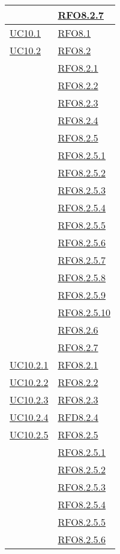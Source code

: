 \begin{longtable}{|>{\centering}m{5cm}|m{5cm}<{\centering}|}
& \hyperlink{RFO8.2.7}{RFO8.2.7}\\\hline
\hyperlink{UC10.1}{UC10.1} & \hyperlink{RFO8.1}{RFO8.1}\\\hline
\hyperlink{UC10.2}{UC10.2} & \hyperlink{RFO8.2}{RFO8.2}\\
& \hyperlink{RFO8.2.1}{RFO8.2.1}\\
& \hyperlink{RFO8.2.2}{RFO8.2.2}\\
& \hyperlink{RFO8.2.3}{RFO8.2.3}\\
& \hyperlink{RFO8.2.4}{RFO8.2.4}\\
& \hyperlink{RFO8.2.5}{RFO8.2.5}\\
& \hyperlink{RFO8.2.5.1}{RFO8.2.5.1}\\
& \hyperlink{RFO8.2.5.2}{RFO8.2.5.2}\\
& \hyperlink{RFO8.2.5.3}{RFO8.2.5.3}\\
& \hyperlink{RFO8.2.5.4}{RFO8.2.5.4}\\
& \hyperlink{RFO8.2.5.5}{RFO8.2.5.5}\\
& \hyperlink{RFO8.2.5.6}{RFO8.2.5.6}\\
& \hyperlink{RFO8.2.5.7}{RFO8.2.5.7}\\
& \hyperlink{RFO8.2.5.8}{RFO8.2.5.8}\\
& \hyperlink{RFO8.2.5.9}{RFO8.2.5.9}\\
& \hyperlink{RFO8.2.5.10}{RFO8.2.5.10}\\
& \hyperlink{RFO8.2.6}{RFO8.2.6}\\
& \hyperlink{RFO8.2.7}{RFO8.2.7}\\\hline
\hyperlink{UC10.2.1}{UC10.2.1} & \hyperlink{RFO8.2.1}{RFO8.2.1}\\\hline
\hyperlink{UC10.2.2}{UC10.2.2} & \hyperlink{RFO8.2.2}{RFO8.2.2}\\\hline
\hyperlink{UC10.2.3}{UC10.2.3} & \hyperlink{RFO8.2.3}{RFO8.2.3}\\\hline
\hyperlink{UC10.2.4}{UC10.2.4} & \hyperlink{RFD8.2.4}{RFD8.2.4}\\\hline
\hyperlink{UC10.2.5}{UC10.2.5} & \hyperlink{RFO8.2.5}{RFO8.2.5}\\
& \hyperlink{RFO8.2.5.1}{RFO8.2.5.1}\\
& \hyperlink{RFO8.2.5.2}{RFO8.2.5.2}\\
& \hyperlink{RFO8.2.5.3}{RFO8.2.5.3}\\
& \hyperlink{RFO8.2.5.4}{RFO8.2.5.4}\\
& \hyperlink{RFO8.2.5.5}{RFO8.2.5.5}\\
& \hyperlink{RFO8.2.5.6}{RFO8.2.5.6}\\

\end{longtable}
